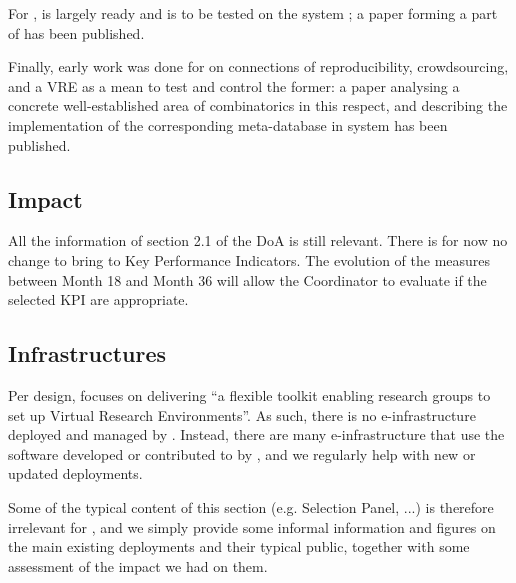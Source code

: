 \documentclass{deliverablereport}
\begin{document}
  For ,
   is largely ready and is to be tested on the
  system \Sage; a paper \cite{Pavlou:2016:MCI:2936924.2936934} forming a part of
   has been published.

  Finally, early work was done for  on connections
  of reproducibility, crowdsourcing, and a VRE as a mean to test and control the former: a
  paper \cite{2016arXiv160100181C} analysing a concrete well-established area of
  combinatorics in this respect, and describing the implementation of the corresponding
  meta-database in \Sage system has been published.

  \subsection{Impact}

  All the information of section 2.1 of the DoA is still relevant. There is for now no
  change to bring to Key Performance Indicators. The evolution of the measures between
  Month 18 and Month 36 will allow the Coordinator to evaluate if the selected KPI are
  appropriate.

\subsection{Infrastructures}

Per design, \ODK focuses on delivering ``a flexible toolkit enabling
research groups to set up Virtual Research Environments''. As such,
there is no e-infrastructure deployed and managed by \ODK. Instead,
there are many e-infrastructure that use the software developed or
contributed to by \ODK, and we regularly help with new or updated
deployments.

Some of the typical content of this section (e.g. Selection Panel,
...) is therefore irrelevant for \ODK, and we simply provide some
informal information and figures on the main existing deployments and
their typical public, together with some assessment of the impact we
had on them.
\end{document}
